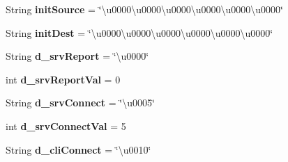 \begin{DoxyCompactItemize}
\item 
\hypertarget{interfacecom_1_1mobii_1_1protocol_1_1_i_protocol_com_aaa56f767bf9c9b17ae65a5c2c79132cb}{String {\bfseries init\-Source} = \char`\"{}\textbackslash{}u0000\textbackslash{}u0000\textbackslash{}u0000\textbackslash{}u0000\textbackslash{}u0000\textbackslash{}u0000\char`\"{}}\label{interfacecom_1_1mobii_1_1protocol_1_1_i_protocol_com_aaa56f767bf9c9b17ae65a5c2c79132cb}

\item 
\hypertarget{interfacecom_1_1mobii_1_1protocol_1_1_i_protocol_com_acac7affdef12d531fde2c34f184ece8e}{String {\bfseries init\-Dest} = \char`\"{}\textbackslash{}u0000\textbackslash{}u0000\textbackslash{}u0000\textbackslash{}u0000\textbackslash{}u0000\textbackslash{}u0000\char`\"{}}\label{interfacecom_1_1mobii_1_1protocol_1_1_i_protocol_com_acac7affdef12d531fde2c34f184ece8e}

\item 
\hypertarget{interfacecom_1_1mobii_1_1protocol_1_1_i_protocol_com_a2c54ad212b7e64b07d3dfe2a88c4803e}{String {\bfseries d\-\_\-srv\-Report} = \char`\"{}\textbackslash{}u0000\char`\"{}}\label{interfacecom_1_1mobii_1_1protocol_1_1_i_protocol_com_a2c54ad212b7e64b07d3dfe2a88c4803e}

\item 
\hypertarget{interfacecom_1_1mobii_1_1protocol_1_1_i_protocol_com_ad0614702ff02b179e07f406b74de0567}{int {\bfseries d\-\_\-srv\-Report\-Val} = 0}\label{interfacecom_1_1mobii_1_1protocol_1_1_i_protocol_com_ad0614702ff02b179e07f406b74de0567}

\item 
\hypertarget{interfacecom_1_1mobii_1_1protocol_1_1_i_protocol_com_a0bfadea739179c3c8b70276f0e65a24a}{String {\bfseries d\-\_\-srv\-Connect} = \char`\"{}\textbackslash{}u0005\char`\"{}}\label{interfacecom_1_1mobii_1_1protocol_1_1_i_protocol_com_a0bfadea739179c3c8b70276f0e65a24a}

\item 
\hypertarget{interfacecom_1_1mobii_1_1protocol_1_1_i_protocol_com_a1f04e7f5f653e2c8a1d6d58582bd4cd1}{int {\bfseries d\-\_\-srv\-Connect\-Val} = 5}\label{interfacecom_1_1mobii_1_1protocol_1_1_i_protocol_com_a1f04e7f5f653e2c8a1d6d58582bd4cd1}

\item 
\hypertarget{interfacecom_1_1mobii_1_1protocol_1_1_i_protocol_com_a7de54c02168d596dea6246fa5861b91e}{String {\bfseries d\-\_\-cli\-Connect} = \char`\"{}\textbackslash{}u0010\char`\"{}}\label{interfacecom_1_1mobii_1_1protocol_1_1_i_protocol_com_a7de54c02168d596dea6246fa5861b91e}


\end{DoxyCompactItemize}
